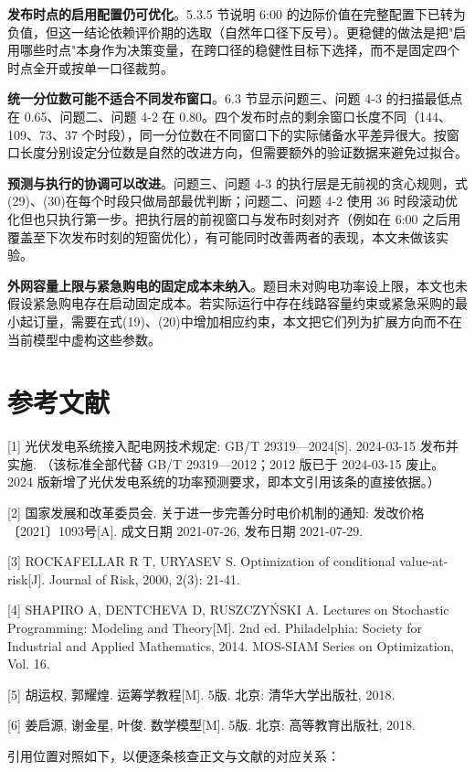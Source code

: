 \documentclass[12pt,a4paper]{ctexart}
\begin{document}
\textbf{发布时点的启用配置仍可优化}。5.3.5 节说明 6:00 的边际价值在完整配置下已转为负值，但这一结论依赖评价期的选取（自然年口径下反号）。更稳健的做法是把"启用哪些时点"本身作为决策变量，在跨口径的稳健性目标下选择，而不是固定四个时点全开或按单一口径裁剪。

\textbf{统一分位数可能不适合不同发布窗口}。6.3 节显示问题三、问题 4-3 的扫描最低点在 0.65、问题二、问题 4-2 在 0.80。四个发布时点的剩余窗口长度不同（144、109、73、37 个时段），同一分位数在不同窗口下的实际储备水平差异很大。按窗口长度分别设定分位数是自然的改进方向，但需要额外的验证数据来避免过拟合。

\textbf{预测与执行的协调可以改进}。问题三、问题 4-3 的执行层是无前视的贪心规则，式(29)、(30)在每个时段只做局部最优判断；问题二、问题 4-2 使用 36 时段滚动优化但也只执行第一步。把执行层的前视窗口与发布时刻对齐（例如在 6:00 之后用覆盖至下次发布时刻的短窗优化），有可能同时改善两者的表现，本文未做该实验。

\textbf{外网容量上限与紧急购电的固定成本未纳入}。题目未对购电功率设上限，本文也未假设紧急购电存在启动固定成本。若实际运行中存在线路容量约束或紧急采购的最小起订量，需要在式(19)、(20)中增加相应约束，本文把它们列为扩展方向而不在当前模型中虚构这些参数。

\section*{参考文献}

[1] 光伏发电系统接入配电网技术规定: GB/T 29319—2024[S]. 2024-03-15 发布并实施. （该标准全部代替 GB/T 29319—2012；2012 版已于 2024-03-15 废止。2024 版新增了光伏发电系统的功率预测要求，即本文引用该条的直接依据。）

[2] 国家发展和改革委员会. 关于进一步完善分时电价机制的通知: 发改价格〔2021〕1093号[A]. 成文日期 2021-07-26, 发布日期 2021-07-29.

[3] ROCKAFELLAR R T, URYASEV S. Optimization of conditional value-at-risk[J]. Journal of Risk, 2000, 2(3): 21-41.

[4] SHAPIRO A, DENTCHEVA D, RUSZCZYŃSKI A. Lectures on Stochastic Programming: Modeling and Theory[M]. 2nd ed. Philadelphia: Society for Industrial and Applied Mathematics, 2014. MOS-SIAM Series on Optimization, Vol. 16.

[5] 胡运权, 郭耀煌. 运筹学教程[M]. 5版. 北京: 清华大学出版社, 2018.

[6] 姜启源, 谢金星, 叶俊. 数学模型[M]. 5版. 北京: 高等教育出版社, 2018.

引用位置对照如下，以便逐条核查正文与文献的对应关系：
\end{document}
